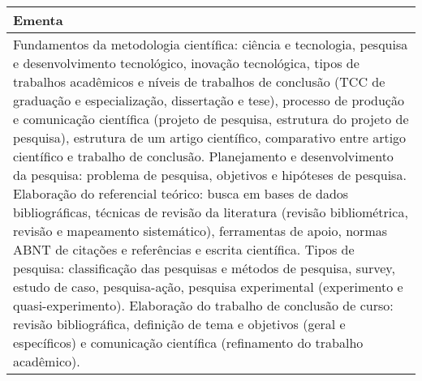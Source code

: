 \begin{quadro}[ht!]
\begin{tabular}{|p{3cm} p{2cm} p{3cm} p{2cm} p{3cm} p{2cm}|}
\multicolumn{6}{|p{15cm}|}{\cellcolor{blue1} Ementa} \\\hline
\hline\multicolumn{6}{|p{15cm}|}{\scriptsize Fundamentos da metodologia científica: ciência e tecnologia, pesquisa e desenvolvimento tecnológico, inovação tecnológica, tipos de trabalhos acadêmicos e níveis de trabalhos de conclusão (TCC de graduação e especialização, dissertação e tese), processo de produção e comunicação científica (projeto de pesquisa, estrutura do projeto de pesquisa), estrutura de um artigo científico, comparativo entre artigo científico e trabalho de conclusão. Planejamento e desenvolvimento da pesquisa: problema de pesquisa, objetivos e hipóteses de pesquisa. Elaboração do referencial teórico: busca em bases de dados bibliográficas, técnicas de revisão da literatura (revisão bibliométrica, revisão e mapeamento sistemático), ferramentas de apoio, normas ABNT de citações e referências e escrita científica. Tipos de pesquisa: classificação das pesquisas e métodos de pesquisa, survey, estudo de caso, pesquisa-ação, pesquisa experimental (experimento e quasi-experimento). Elaboração do trabalho de conclusão de curso: revisão bibliográfica, definição de tema e objetivos (geral e específicos) e comunicação científica (refinamento do trabalho acadêmico).}\\\hline
\hline
	\end{tabular}
\end{quadro}
\clearpage
